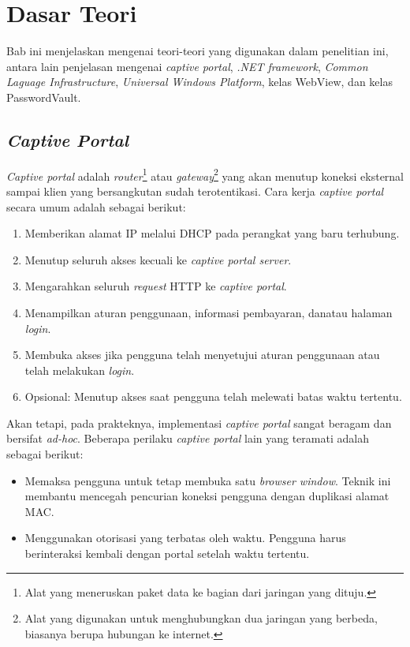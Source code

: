 \chapter{Dasar Teori}
\label{chap:dasar_teori}

Bab ini menjelaskan mengenai teori-teori yang digunakan dalam penelitian ini, antara lain penjelasan mengenai \textit{captive portal}, \textit{.NET framework}, \textit{Common Laguage Infrastructure}, \textit{Universal Windows Platform}, kelas WebView, dan kelas PasswordVault.



\section{\textit{Captive Portal}}
\label{sec:captive_portal}

\textit{Captive portal} adalah \textit{router}\footnote{Alat yang meneruskan paket data ke bagian dari jaringan yang dituju.} atau \textit{gateway}\footnote{Alat yang digunakan untuk menghubungkan dua jaringan yang berbeda, biasanya berupa hubungan ke internet.} yang akan menutup koneksi eksternal sampai klien yang bersangkutan sudah terotentikasi\cite{Potter:2002}. Cara kerja \textit{captive portal} secara umum adalah sebagai berikut:

\begin{enumerate}
    \item{Memberikan alamat IP melalui DHCP pada perangkat yang baru terhubung.}
    \item{Menutup seluruh akses kecuali ke \textit{captive portal server}.}
    \item{Mengarahkan seluruh \textit{request} HTTP ke \textit{captive portal}.}
    \item{Menampilkan aturan penggunaan, informasi pembayaran, dan\/atau halaman \textit{login}.}
    \item{Membuka akses jika pengguna telah menyetujui aturan penggunaan atau telah melakukan \textit{login}.}
    \item{Opsional: Menutup akses saat pengguna telah melewati batas waktu tertentu.}
\end{enumerate}

Akan tetapi, pada prakteknya, implementasi \textit{captive portal} sangat beragam dan bersifat \textit{ad-hoc}\cite{HTTPWG_CP:2016}. Beberapa perilaku \textit{captive portal} lain yang teramati adalah sebagai berikut:

\begin{itemize}
    \item{Memaksa pengguna untuk tetap membuka satu \textit{browser window}. Teknik ini membantu mencegah pencurian koneksi pengguna dengan duplikasi alamat MAC.}
    \item{Menggunakan otorisasi yang terbatas oleh waktu. Pengguna harus berinteraksi kembali dengan portal setelah waktu tertentu.}
\end{itemize}

